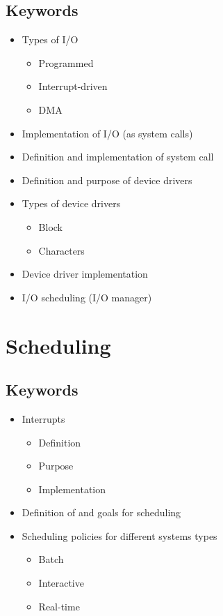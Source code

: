 \documentclass{report}
\begin{document}
\section{Keywords}
\begin{itemize}
\item Types of I/O
\begin{itemize}
\item Programmed
\item Interrupt-driven
\item DMA
\end{itemize}
\item Implementation of I/O (as system calls)
\item Definition and implementation of system call
\item Definition and purpose of device drivers
\item Types of device drivers
\begin{itemize}
\item Block
\item Characters
\end{itemize}
\item Device driver implementation
\item I/O scheduling (I/O manager)
\end{itemize}
\newpage
\chapter{Scheduling}

\section{Keywords}
\begin{itemize}
\item Interrupts
\begin{itemize}
\item Definition
\item Purpose
\item Implementation
\end{itemize}
\item Definition of and goals for scheduling
\item Scheduling policies for different systems types
\begin{itemize}
\item Batch
\item Interactive
\item Real-time
\end{itemize}
\end{itemize}
\newpage
\end{document}
